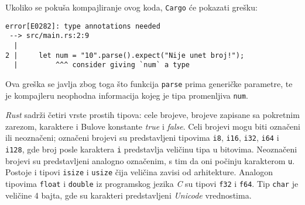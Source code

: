 \documentclass[12pt,oneside]{memoir}
\begin{document}
Ukoliko se pokuša kompajliranje ovog koda, \texttt{Cargo} će
pokazati grešku:

\begin{verbatim}
error[E0282]: type annotations needed
 --> src/main.rs:2:9
  |
2 |     let num = "10".parse().expect("Nije unet broj!");
  |         ^^^ consider giving `num` a type
\end{verbatim}

Ova greška se javlja zbog toga što funkcija \texttt{parse}
prima generičke parametre, te je kompajleru neophodna informacija
kojeg je tipa promenljiva \texttt{num}.

\emph{Rust} sadrži četiri vrste prostih tipova: cele brojeve,
brojeve zapisane sa pokretnim zarezom, karaktere i Bulove
konstante \emph{true} i \emph{false}. Celi brojevi mogu biti
označeni ili neoznačeni; označeni brojevi su predstavljeni
tipovima \texttt{i8}, \texttt{i16}, \texttt{i32}, \texttt{i64} i
\texttt{i128}, gde broj posle karaktera \texttt{i} predstavlja
veličinu tipa u bitovima. Neoznačeni brojevi su predstavljeni
analogno označenim, s tim da oni počinju karakterom \texttt{u}.
Postoje i tipovi \texttt{isize} i \texttt{usize} čija veličina
zavisi od arhitekture.
Analogon tipovima \texttt{float} i \texttt{double} iz programskog
jezika \emph{C} su tipovi \texttt{f32} i \texttt{f64}. Tip
\texttt{char} je veličine 4 bajta, gde su karakteri predstavljeni
\emph{Unicode} vrednostima.



\end{document}
